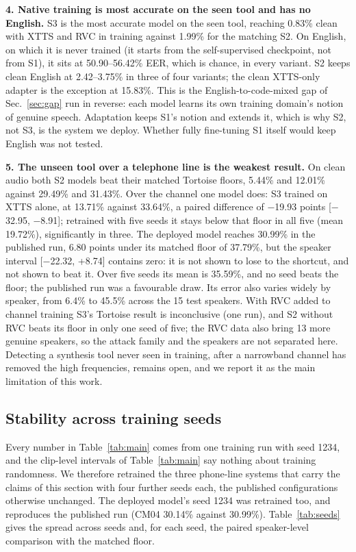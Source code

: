 \textbf{4. Native training is most accurate on the seen tool and has no English.} S3 is the most
accurate model on the seen tool, reaching 0.83\% clean with XTTS and RVC in training
against 1.99\% for the matching S2. On English, on which it is never trained (it starts
from the self-supervised checkpoint, not from S1), it sits at 50.90--56.42\% EER, which
is chance, in every variant. S2 keeps clean English at 2.42--3.75\% in three of four
variants; the clean XTTS-only adapter is the exception at 15.83\%. This is the
English-to-code-mixed gap of Sec.~\ref{sec:gap} run in reverse: each model learns its
own training domain's notion of genuine speech. Adaptation keeps S1's notion and extends
it, which is why S2, not S3, is the system we deploy. Whether fully fine-tuning S1 itself
would keep English was not tested.

\textbf{5. The unseen tool over a telephone line is the weakest result.} On clean
audio both S2 models beat their matched Tortoise floors, 5.44\% and 12.01\% against
29.49\% and 31.43\%. Over the channel one model does: S3 trained on XTTS alone, at
13.71\% against 33.64\%, a paired difference of $-$19.93 points [$-$32.95, $-$8.91];
retrained with five seeds it stays below that floor in all five (mean 19.72\%),
significantly in three. The deployed model reaches 30.99\% in the published run, 6.80
points under its matched floor of 37.79\%, but the speaker interval
[$-$22.32, +8.74] contains zero: it is not shown to lose to the shortcut, and not
shown to beat it. Over five seeds its mean is 35.59\%, and no seed beats the floor;
the published run was a favourable draw. Its error also varies widely by speaker, from
6.4\% to 45.5\% across the 15 test speakers. With RVC added to channel training S3's
Tortoise result is inconclusive (one run), and S2 without RVC beats its floor in only
one seed of five;
the RVC data also bring 13 more genuine speakers, so the attack family and the speakers
are not separated here. Detecting a synthesis tool never
seen in training, after a narrowband channel has removed the high frequencies,
remains open, and we report it as the main limitation of this work.

\subsection{Stability across training seeds}
\label{sec:seeds}

Every number in Table~\ref{tab:main} comes from one training run with seed 1234, and the clip-level
intervals of Table~\ref{tab:main} say nothing about training randomness. We therefore
retrained the three phone-line systems that carry the claims of this section with
four further seeds each, the published configurations otherwise unchanged. The
deployed model's seed 1234 was retrained too, and reproduces the published run (CM04
30.14\% against 30.99\%). Table~\ref{tab:seeds} gives the spread across seeds and,
for each seed, the paired speaker-level comparison with the matched floor.

